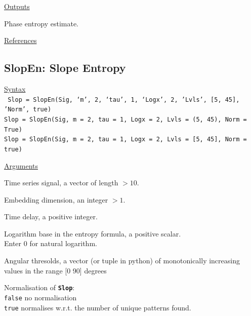 \documentclass[12pt, a4paper, titlepage, openany]{book}
\begin{document}
\noindent \ul{Outputs}
\begin{description}[labelsep=1cm, labelwidth=2cm, nosep, style=multiline,leftmargin=3cm]\footnotesize
\item[\texttt{Phas}]	Phase entropy estimate.
\end{description}

\noindent \ul{References}\hspace{1cm}
\cite{Phas1}



\newpage
\subsection{\normalsize SlopEn: \hspace{15mm} Slope Entropy}\label{SlopEn}
\noindent\ul{Syntax} \vspace{6mm} \\ \noindent \texttt{\footnotesize
Slop = SlopEn(Sig, ‘m’, 2, ‘tau’, 1, ‘Logx’, 2, 'Lvls', [5, 45], 'Norm', true) \\
Slop = SlopEn(Sig, m = 2, tau = 1, Logx = 2, Lvls = (5, 45), Norm = True) \\
Slop = SlopEn(Sig, m = 2, tau = 1, Logx = 2, Lvls = [5, 45], Norm = true)}

\noindent \ul{Arguments}
\begin{description}[labelsep=1cm, labelwidth=2cm, nosep, style=multiline,leftmargin=3cm]\footnotesize
\item[\texttt{Sig}]		Time series signal, a vector of length $> 10$.
\item[\texttt{m}]		Embedding dimension, an integer $> 1$.
\item[\texttt{tau}]		Time delay, a positive integer.
\item[\texttt{Logx}]	Logarithm base in the entropy formula, a positive scalar.\\
			Enter 0 for natural logarithm.
\item[\texttt{Lvls}]	Angular thresolds, a vector (or tuple in python) of monotonically increasing   
              values in the range [0 90] degrees
\item[\texttt{Norm}]	Normalisation of \texttt{\textbf{Slop}}:\\
						\texttt{false} \hspace{10pt} no normalisation \\
						\texttt{true} \hspace{15pt} normalises w.r.t. the number of unique patterns found.
\end{description}
\end{document}
